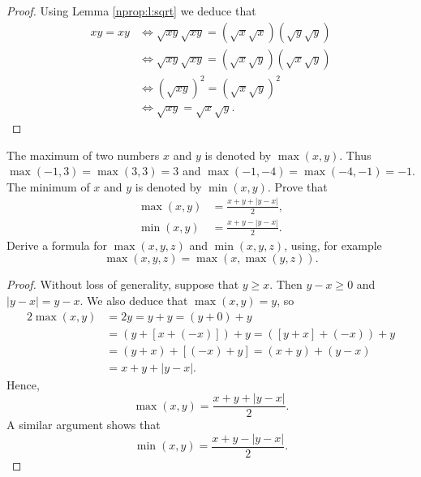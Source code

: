\begin{proof}
	Using Lemma \ref{nprop:l:sqrt} we deduce that
	\begin{align*}
		x y = x y & \iff \sqrt{x y} \sqrt{x y} = \left( \sqrt{x} \sqrt{x} \right) \left( \sqrt{y} \sqrt{y} \right) \\
		          & \iff \sqrt{x y} \sqrt{x y} = \left( \sqrt{x} \sqrt{y} \right) \left( \sqrt{x} \sqrt{y} \right) \\
		          & \iff \left( \sqrt{x y} \right)^2 = \left( \sqrt{x} \sqrt{y} \right)^2                          \\
		          & \iff \sqrt{x y} = \sqrt{x} \sqrt{y}.
	\end{align*}
\end{proof}


\addtocounter{problem}{12}
\Newpage
\begin{problem} %
	\label{nprop:p:13}
	The maximum of two numbers $x$ and $y$ is denoted by $\max(x, y)$. Thus $\max(-1,3) = \max(3,3) = 3$ and $\max(-1,-4) = \max(-4,-1)= -1$. The minimum of $x$ and $y$ is denoted by $\min(x, y)$. Prove that
	\begin{align*}
		\max(x, y)  & = \frac{x + y + |y - x|}{2}, \\
		\min (x, y) & = \frac{x + y - |y - x|}{2}.
	\end{align*}
	Derive a formula for $\max(x, y, z)$ and $\min(x, y, z)$, using, for example
	$$
		\max(x, y, z) = \max(x, \max(y, z)).
	$$
\end{problem}

\begin{proof}
	Without loss of generality, suppose that $y \geq x$. Then $y - x \geq 0$ and $|y - x| = y - x$. We also deduce that $\max(x, y) = y$, so
	\begin{align*}
		2 \max(x, y) & = 2 y = y + y = (y + 0) + y                    \\
		             & = (y + [x + (-x)]) + y  = ([y + x] + (-x)) + y \\
		             & = (y + x) + [(-x) + y]  = (x + y) + (y - x)    \\
		             & = x + y + |y - x|.
	\end{align*}
	Hence,
	$$
		\max(x, y) = \frac{x + y + |y - x|}{2}.
	$$
	A similar argument shows that
	$$
		\min(x, y) = \frac{x + y - |y - x|}{2}.
	$$
\end{proof}

